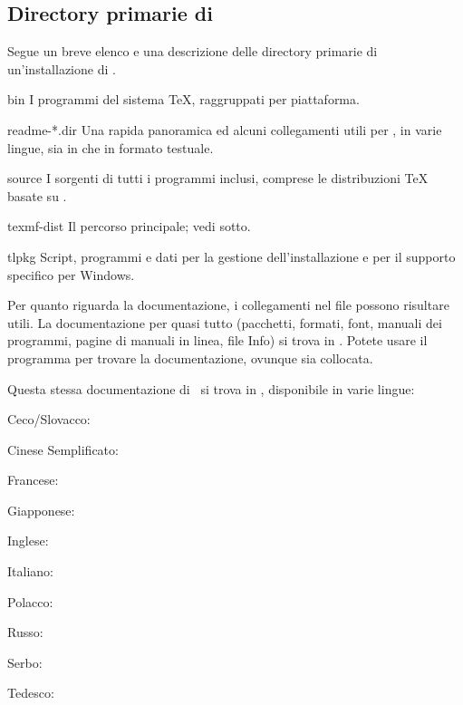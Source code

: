 \documentclass{article}
\begin{document}
\subsection{Directory primarie di \protect\TL{}}
\label{sec:tld}

Segue un breve elenco e una descrizione delle directory primarie di
un'installazione di \TL.

\begin{ttdescription}
\item[bin] I programmi del sistema \TeX{}, raggruppati per piattaforma.
%
\item[readme-*.dir] Una rapida panoramica ed alcuni collegamenti utili per 
  \TL{},
  in varie lingue, sia in \HTML{} che in formato testuale.
%
\item[source] I sorgenti di tutti i programmi inclusi, comprese le
  distribuzioni \TeX{} basate su \Webc{}.
%
\item[texmf-dist] Il percorso principale; vedi  sotto.
%
\item[tlpkg] Script, programmi e dati per la gestione
  dell'installazione e per il supporto specifico per Windows.
\end{ttdescription}

Per quanto riguarda la documentazione, i collegamenti nel file
 possono risultare utili. La documentazione per quasi
tutto (pacchetti, formati, font, manuali dei programmi, 
pagine di manuali in linea, file Info)
si trova in . Potete usare il programma
 per trovare la documentazione, ovunque sia
collocata.

Questa stessa documentazione di \TL\ si trova in
, disponibile in varie lingue:

\begin{itemize*}
\item{Ceco/Slovacco:} 
\item{Cinese Semplificato:} 
\item{Francese:} 
\item{Giapponese:} 
\item{Inglese:} 
\item{Italiano:} 
\item{Polacco:} 
\item{Russo:} 
\item{Serbo:} 
\item{Tedesco:} 
\end{itemize*}
\end{document}
